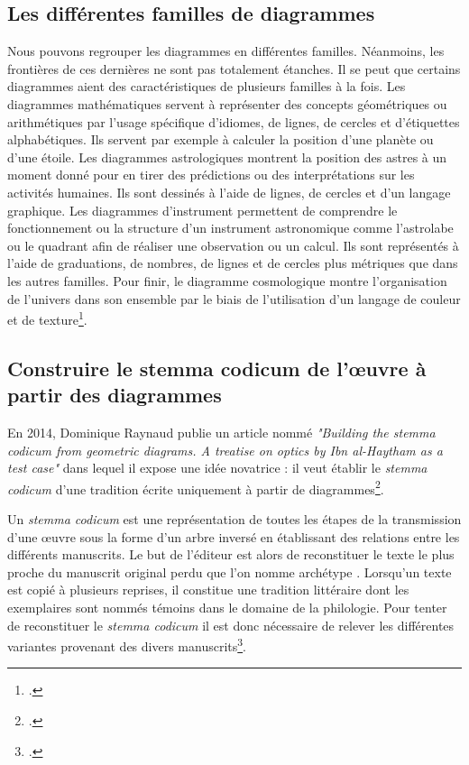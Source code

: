 	\subsection{Les différentes familles de diagrammes}
Nous pouvons regrouper les diagrammes en différentes familles. Néanmoins, les frontières de ces dernières ne sont pas totalement étanches. Il se peut que certains diagrammes aient des caractéristiques de plusieurs familles à la fois. Les diagrammes mathématiques servent à représenter des concepts géométriques ou arithmétiques par l'usage spécifique d'idiomes, de lignes, de cercles et d'étiquettes alphabétiques. Ils servent par exemple à calculer la position d'une planète ou d'une étoile. Les diagrammes astrologiques montrent la position des astres à un moment donné pour en tirer des prédictions ou des interprétations sur les activités humaines. Ils sont dessinés à l'aide de lignes, de cercles et d'un langage graphique. Les diagrammes d'instrument permettent de comprendre le fonctionnement ou la structure d'un instrument astronomique comme l'astrolabe ou le quadrant afin de réaliser une observation ou un calcul. Ils sont représentés à l'aide de graduations, de nombres, de lignes et de cercles plus métriques que dans les autres familles. Pour finir, le diagramme cosmologique montre l'organisation de l'univers dans son ensemble par le biais de l'utilisation d'un langage de couleur et de texture\footcite{Conference2025Long2025}.


\subsection{Construire le stemma codicum de l'œuvre à partir des diagrammes}

En 2014, Dominique Raynaud publie un article nommé \textit{"Building the stemma codicum from geometric diagrams. A treatise on optics by Ibn al-Haytham as a test case"} dans lequel il expose une idée novatrice : il veut établir le \textit{stemma codicum} d'une tradition écrite uniquement à partir de diagrammes\footcite{raynaudBuildingStemmaCodicum2014}.

Un \textit{stemma codicum} est une représentation de toutes les étapes de la transmission d'une œuvre sous la forme d'un arbre inversé en établissant des relations entre les différents manuscrits. Le but de l'éditeur est alors de reconstituer le texte le plus proche du manuscrit original perdu que l'on nomme \og archétype \fg. Lorsqu'un texte est copié à plusieurs reprises, il constitue une \og tradition littéraire \fg dont les exemplaires sont nommés \og témoins \fg dans le domaine de la philologie. Pour tenter de reconstituer le \textit{stemma codicum} il est donc nécessaire de relever les différentes variantes provenant des divers manuscrits\footcite{pouliquenUsingLatticesReconstructing}.

